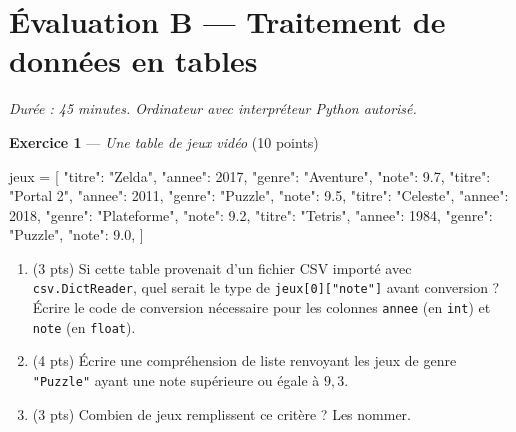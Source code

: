 \section*{Évaluation B --- Traitement de données en tables}
\textit{Durée : 45 minutes. Ordinateur avec interpréteur Python autorisé.}


\bigskip

\textbf{Exercice 1} --- \textit{Une table de jeux vidéo} \hfill (10 points)

\begin{python}
jeux = [
    {"titre": "Zelda", "annee": 2017, "genre": "Aventure", "note": 9.7},
    {"titre": "Portal 2", "annee": 2011, "genre": "Puzzle", "note": 9.5},
    {"titre": "Celeste", "annee": 2018, "genre": "Plateforme", "note": 9.2},
    {"titre": "Tetris", "annee": 1984, "genre": "Puzzle", "note": 9.0},
]
\end{python}

\begin{enumerate}
  \item (3 pts) Si cette table provenait d'un fichier CSV importé avec \lstinline{csv.DictReader}, quel serait le type de \lstinline{jeux[0]["note"]} avant conversion ? Écrire le code de conversion nécessaire pour les colonnes \lstinline{annee} (en \lstinline{int}) et \lstinline{note} (en \lstinline{float}).
  \item (4 pts) Écrire une compréhension de liste renvoyant les jeux de genre \lstinline{"Puzzle"} ayant une note supérieure ou égale à $9{,}3$.
  \item (3 pts) Combien de jeux remplissent ce critère ? Les nommer.
\end{enumerate}



